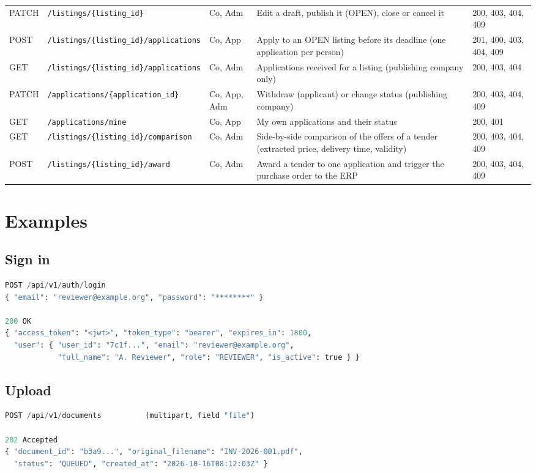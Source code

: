 \documentclass[11pt,a4paper]{report}
\begin{document}
{\begin{longtable}{L{1.3cm}L{5.0cm}L{1.6cm}L{4.4cm}L{1.9cm}}
PATCH & \texttt{/\allowbreak listings/\allowbreak \{listing\_id\}} & Co, Adm & Edit a draft, publish it (OPEN), close or cancel it & 200, 403, 404, 409\\
POST & \texttt{/\allowbreak listings/\allowbreak \{listing\_id\}/\allowbreak applications} & Co, App & Apply to an OPEN listing before its deadline (one application per person) & 201, 400, 403, 404, 409\\
GET & \texttt{/\allowbreak listings/\allowbreak \{listing\_id\}/\allowbreak applications} & Co, Adm & Applications received for a listing (publishing company only) & 200, 403, 404\\
PATCH & \texttt{/\allowbreak applications/\allowbreak \{application\_id\}} & Co, App, Adm & Withdraw (applicant) or change status (publishing company) & 200, 403, 404, 409\\
GET & \texttt{/\allowbreak applications/\allowbreak mine} & Co, App & My own applications and their status & 200, 401\\
GET & \texttt{/\allowbreak listings/\allowbreak \{listing\_id\}/\allowbreak comparison} & Co, Adm & Side-by-side comparison of the offers of a tender (extracted price, delivery time, validity) & 200, 403, 404, 409\\
POST & \texttt{/\allowbreak listings/\allowbreak \{listing\_id\}/\allowbreak award} & Co, Adm & Award a tender to one application and trigger the purchase order to the ERP & 200, 403, 404, 409\\
\hline
\end{longtable}}


\section{Examples}
\subsection{Sign in}
\begin{lstlisting}[language=Python,morekeywords={true,false,null}]
POST /api/v1/auth/login
{ "email": "reviewer@example.org", "password": "********" }

200 OK
{ "access_token": "<jwt>", "token_type": "bearer", "expires_in": 1800,
  "user": { "user_id": "7c1f...", "email": "reviewer@example.org",
            "full_name": "A. Reviewer", "role": "REVIEWER", "is_active": true } }
\end{lstlisting}

\subsection{Upload}
\begin{lstlisting}[language=Python,morekeywords={true,false,null}]
POST /api/v1/documents          (multipart, field "file")

202 Accepted
{ "document_id": "b3a9...", "original_filename": "INV-2026-001.pdf",
  "status": "QUEUED", "created_at": "2026-10-16T08:12:03Z" }
\end{lstlisting}
\end{document}
